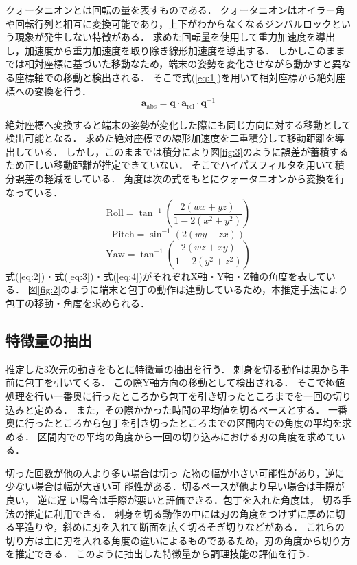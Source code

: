 クォータニオンとは回転の量を表すものである．
クォータニオンはオイラー角や回転行列と相互に変換可能であり，上下がわからなくなるジンバルロックという現象が発生しない特徴がある．
求めた回転量を使用して重力加速度を導出し，加速度から重力加速度を取り除き線形加速度を導出する．
しかしこのままでは相対座標に基づいた移動なため，端末の姿勢を変化させながら動かすと異なる座標軸での移動と検出される．
そこで式(\ref{eq:1})を用いて相対座標から絶対座標への変換を行う．
\begin{equation}
	\mathbf{a}_{\text{abs}} = \mathbf{q} \cdot \mathbf{a}_{\text{rel}} \cdot \mathbf{q}^{-1}
	\label{eq:1}
\end{equation}
	
絶対座標へ変換すると端末の姿勢が変化した際にも同じ方向に対する移動として検出可能となる．
求めた絶対座標での線形加速度を二重積分して移動距離を導出している．
しかし，このままでは積分により図\ref{fig:3}のように誤差が蓄積するため正しい移動距離が推定できていない．
そこでハイパスフィルタを用いて積分誤差の軽減をしている．
角度は次の式をもとにクォータニオンから変換を行なっている．
\begin{equation}
	\text{Roll} = \tan^{-1}\left( \frac{2(w x + y z)}{1 - 2(x^2 + y^2)} \right)
	\label{eq:2}
\end{equation}
\begin{equation}
	\text{Pitch} = \sin^{-1}\left( 2(w y - z x) \right)
	\label{eq:3}
\end{equation}
\begin{equation}
	\text{Yaw} = \tan^{-1}\left( \frac{2(w z + x y)}{1 - 2(y^2 + z^2)} \right)
	\label{eq:4}
\end{equation}
式(\ref{eq:2})・式(\ref{eq:3})・式(\ref{eq:4})がそれぞれX軸・Y軸・Z軸の角度を表している．
図\ref{fig:2}のように端末と包丁の動作は連動しているため，本推定手法により包丁の移動・角度を求められる．

\subsection{特徴量の抽出}
推定した3次元の動きをもとに特徴量の抽出を行う．
刺身を切る動作は奥から手前に包丁を引いてくる．
この際Y軸方向の移動として検出される．
そこで極値処理を行い一番奥に行ったところから包丁を引き切ったところまでを一回の切り込みと定める．
また，その際かかった時間の平均値を切るペースとする．
一番奥に行ったところから包丁を引き切ったところまでの区間内での角度の平均を求める．
区間内での平均の角度から一回の切り込みにおける刃の角度を求めている．

切った回数が他の人より多い場合は切っ
た物の幅が小さい可能性があり，逆に少ない場合は幅が大きい可
能性がある．切るペースが他より早い場合は手際が良い， 逆に遅
い場合は手際が悪いと評価できる．包丁を入れた角度は， 切る手法の推定に利用できる．
刺身を切る動作の中には刃の角度をつけずに厚めに切る平造りや，斜めに刃を入れて断面を広く切るそぎ切りなどがある．
これらの切り方は主に刃を入れる角度の違いによるものであるため，刃の角度から切り方を推定できる．
このように抽出した特徴量から調理技能の評価を行う．
